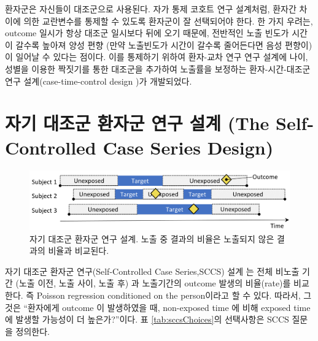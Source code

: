\documentclass[11pt]{book}
\theoremstyle{definition}
\theoremstyle{definition}
\theoremstyle{definition}
\theoremstyle{remark}
\begin{document}
환자군은 자신들이 대조군으로 사용된다. 자가 통제 코호트 연구 설계처럼,
환자간 차이에 의한 교란변수를 통제할 수 있도록 환자군이 잘 선택되어야
한다. 한 가지 우려는, outcome 일시가 항상 대조군 일시보다 뒤에 오기
때문에, 전반적인 노출 빈도가 시간이 갈수록 높아져 양성 편향 (만약
노출빈도가 시간이 갈수록 줄어든다면 음성 편향이) 이 일어날 수 있다는
점이다. 이를 통제하기 위하여 환자-교차 연구 연구 설계에 나이, 성별을
이용한 짝짓기를 통한 대조군을 추가하여 노출률을 보정하는
환자-시간-대조군 연구 설계(case-time-control design
\citep{suissa_1995})가 개발되었다. 

\section{자기 대조군 환자군 연구 설계 (The Self-Controlled Case Series
Design)}\label{-----the-self-controlled-case-series-design}


\begin{figure}[h]

{\centering \includegraphics[width=0.9\linewidth]{images/PopulationLevelEstimation/selfControlledCaseSeries} 

}

\caption{자기 대조군 환자군 연구 설계. 노출 중 결과의 비율은 노출되지 않은 결과의 비율과 비교된다.}\label{fig:selfControlledCaseSeries}
\end{figure}

자기 대조군 환자군 연구(Self-Controlled Case Series,SCCS) 설계
\citep{farrington_1995, whitaker_2006}는 전체 비노출 기간 (노출 이전,
노출 사이, 노출 후) 과 노출기간의 outcome 발생의 비율(rate)를 비교한다.
즉 Poisson regression conditioned on the person이라고 할 수 있다.
따라서, 그것은 ``환자에게 outcome 이 발생하였을 때, non-exposed time 에
비해 exposed time 에 발생할 가능성이 더 높은가?''이다. 표
\ref{tab:sccsChoices}의 선택사항은 SCCS 질문을 정의한다.
 
\end{document}
